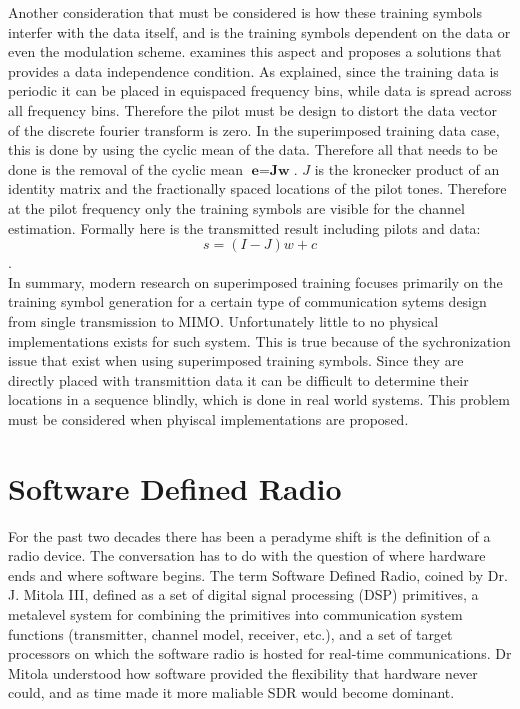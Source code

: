 Another consideration that must be considered is how these training symbols interfer with the data itself, and is the training symbols dependent on the data or even the modulation scheme.\cite{15} examines this aspect and proposes a solutions that provides a data independence condition.  As explained, since the training data is periodic it can be placed in equispaced frequency bins, while data is spread across all frequency bins.   Therefore the pilot must be design to distort the data vector of the discrete fourier transform is zero.  In the superimposed training data case, this is done by using the cyclic mean of the data.  Therefore all that needs to be done is the removal of the cyclic mean \(\textbf{e}=\textbf{Jw}\).  \(J\) is the kronecker product of an identity matrix and the fractionally spaced locations of the pilot tones.  Therefore at the pilot frequency only the training symbols are visible for the channel estimation.  Formally here is the transmitted result including pilots and data: \[ s= (I-J)w+c  \].\\


In summary, modern research on superimposed training focuses primarily on the training symbol generation for a certain type of communication sytems design from single transmission to MIMO.  Unfortunately little to no physical implementations exists for such system.  This is true because of the sychronization issue that exist when using superimposed training symbols.  Since they are directly placed with transmittion data it can be difficult to determine their locations in a sequence blindly, which is done in real world systems.  This problem must be considered when phyiscal implementations are proposed.\\

\section{Software Defined Radio}

For the past two decades there has been a peradyme shift is the definition of a radio device.  The conversation has to do with the question of where hardware ends and where software begins.  The term Software Defined Radio, coined by Dr. J. Mitola III,  defined as a set of digital signal processing (DSP) primitives, a metalevel system for combining the primitives into communication system functions (transmitter, channel model, receiver, etc.), and a set of target processors on which the software radio is hosted for real-time communications\cite{21}.  Dr Mitola understood how software provided the flexibility that hardware never could, and as time made it more maliable SDR would become dominant.\\

